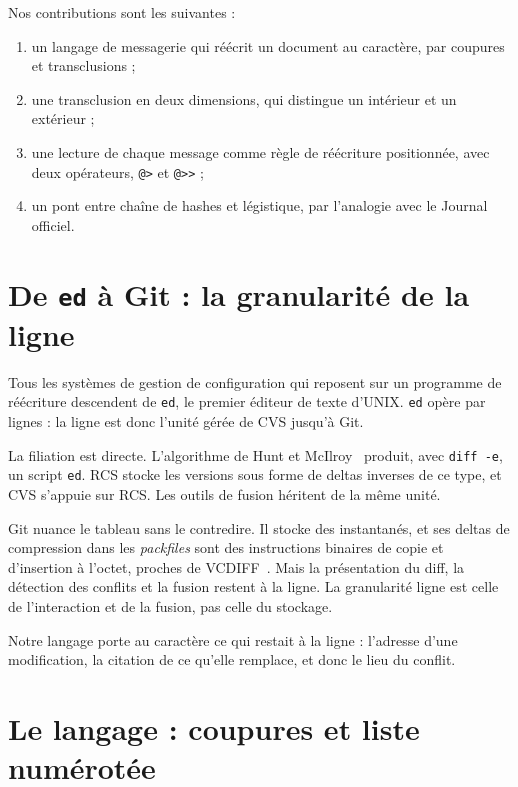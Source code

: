 \documentclass[11pt,a4paper]{article}
\newcommand{\cd}[1]{\texttt{#1}}
\begin{document}
Nos contributions sont les suivantes :
\begin{enumerate}
  \item un langage de messagerie qui réécrit un document au caractère, par coupures et transclusions ;
  \item une transclusion en deux dimensions, qui distingue un intérieur et un extérieur ;
  \item une lecture de chaque message comme règle de réécriture positionnée, avec deux opérateurs, \cd{@>} et \cd{@>{}>} ;
  \item un pont entre chaîne de hashes et légistique, par l'analogie avec le Journal officiel.
\end{enumerate}

\section{De \texttt{ed} à Git : la granularité de la ligne}

Tous les systèmes de gestion de configuration qui reposent sur un programme de réécriture descendent de \cd{ed}, le premier éditeur de texte d'UNIX. \cd{ed} opère par lignes : la ligne est donc l'unité gérée de CVS jusqu'à Git.

La filiation est directe. L'algorithme de Hunt et McIlroy~\cite{hunt1976} produit, avec \cd{diff -e}, un script \cd{ed}. RCS stocke les versions sous forme de deltas inverses de ce type, et CVS s'appuie sur RCS. Les outils de fusion héritent de la même unité.

Git nuance le tableau sans le contredire. Il stocke des instantanés, et ses deltas de compression dans les \emph{packfiles} sont des instructions binaires de copie et d'insertion à l'octet, proches de VCDIFF~\cite{rfc3284}. Mais la présentation du diff, la détection des conflits et la fusion restent à la ligne. La granularité ligne est celle de l'interaction et de la fusion, pas celle du stockage.

Notre langage porte au caractère ce qui restait à la ligne : l'adresse d'une modification, la citation de ce qu'elle remplace, et donc le lieu du conflit.

\section{Le langage : coupures et liste numérotée}
\end{document}
